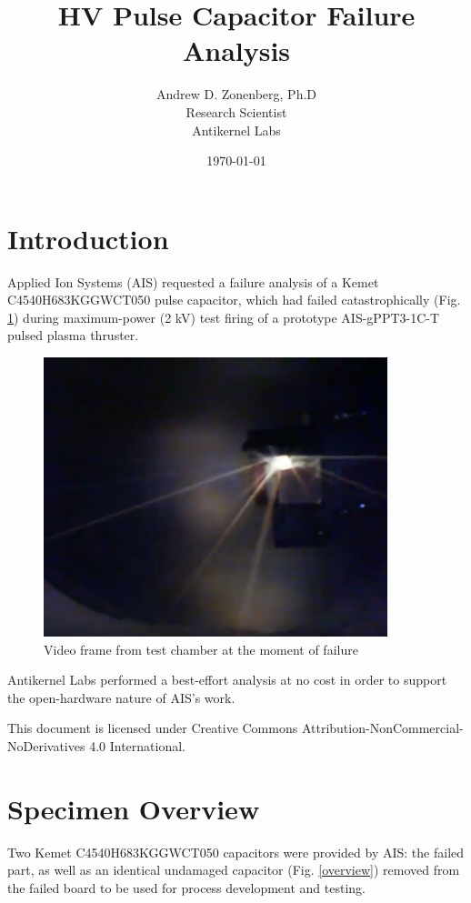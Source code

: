 \documentclass{article}
\begin{document}
\title{HV Pulse Capacitor Failure Analysis }
\author {Andrew D. Zonenberg, Ph.D \\ Research Scientist \\ Antikernel Labs}
\date{\today}
\maketitle

\section{Introduction}

Applied Ion Systems (AIS) requested a failure analysis of a Kemet C4540H683KGGWCT050 pulse capacitor, which had failed
catastrophically (Fig. \ref{failure}) during maximum-power (2 kV) test firing of a prototype AIS-gPPT3-1C-T pulsed
plasma thruster.

\begin{figure}[h]
\includegraphics[width=10cm,keepaspectratio]{cap-failure.jpg}
\caption{Video frame from test chamber at the moment of failure}
\label{failure}
\end{figure}

Antikernel Labs performed a best-effort analysis at no cost in order to support the open-hardware nature of AIS's work.

This document is licensed under Creative Commons Attribution-NonCommercial-NoDerivatives 4.0 International.

\pagebreak
\section{Specimen Overview}

Two Kemet C4540H683KGGWCT050 capacitors were provided by AIS: the failed part, as well as an identical undamaged
capacitor (Fig. \ref{overview}) removed from the failed board to be used for process development and testing.
\end{document}
